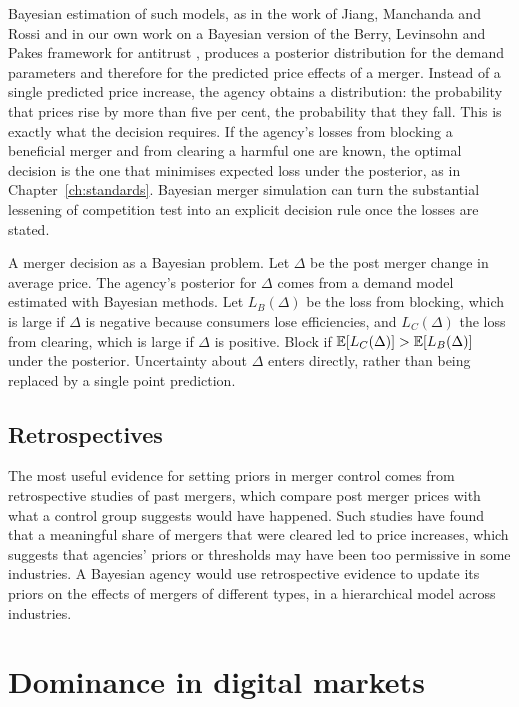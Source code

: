 Bayesian estimation of such models, as in the work of Jiang, Manchanda and Rossi \citep{jiang2009} and in our own work on a Bayesian version of the Berry, Levinsohn and Pakes framework for antitrust \citep{polson_sokolov_blp}, produces a posterior distribution for the demand parameters and therefore for the predicted price effects of a merger. Instead of a single predicted price increase, the agency obtains a distribution: the probability that prices rise by more than five per cent, the probability that they fall. This is exactly what the decision requires. If the agency's losses from blocking a beneficial merger and from clearing a harmful one are known, the optimal decision is the one that minimises expected loss under the posterior, as in Chapter~\ref{ch:standards}. Bayesian merger simulation can turn the substantial lessening of competition test into an explicit decision rule once the losses are stated.

\begin{keybox}
A merger decision as a Bayesian problem. Let $\Delta$ be the post merger change in average price. The agency's posterior for $\Delta$ comes from a demand model estimated with Bayesian methods. Let $L_B(\Delta)$ be the loss from blocking, which is large if $\Delta$ is negative because consumers lose efficiencies, and $L_C(\Delta)$ the loss from clearing, which is large if $\Delta$ is positive. Block if $\mathbb{E}[L_C(\Delta)] > \mathbb{E}[L_B(\Delta)]$ under the posterior. Uncertainty about $\Delta$ enters directly, rather than being replaced by a single point prediction.
\end{keybox}

\subsection{Retrospectives}

The most useful evidence for setting priors in merger control comes from retrospective studies of past mergers, which compare post merger prices with what a control group suggests would have happened. Such studies have found that a meaningful share of mergers that were cleared led to price increases, which suggests that agencies' priors or thresholds may have been too permissive in some industries. A Bayesian agency would use retrospective evidence to update its priors on the effects of mergers of different types, in a hierarchical model across industries.

\section{Dominance in digital markets}

